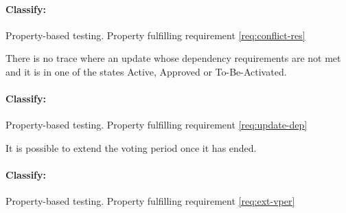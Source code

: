 \paragraph{Classify:}
Property-based testing. Property fulfilling requirement \ref{req:conflict-res}

\begin{property}\label{prop:update-dep}
  There is no trace where an update whose dependency requirements are not met
  and it is in one of the states Active, Approved or
  To-Be-Activated.
\end{property}

\paragraph{Classify:} Property-based testing. Property fulfilling requirement
\ref{req:update-dep}

\begin{property}\label{prop:dur-vot-period}
  It is possible to extend the voting period once it has ended.
\end{property}

\paragraph{Classify:} Property-based testing. Property fulfilling requirement
\ref{req:ext-vper}

%
%
%
%


